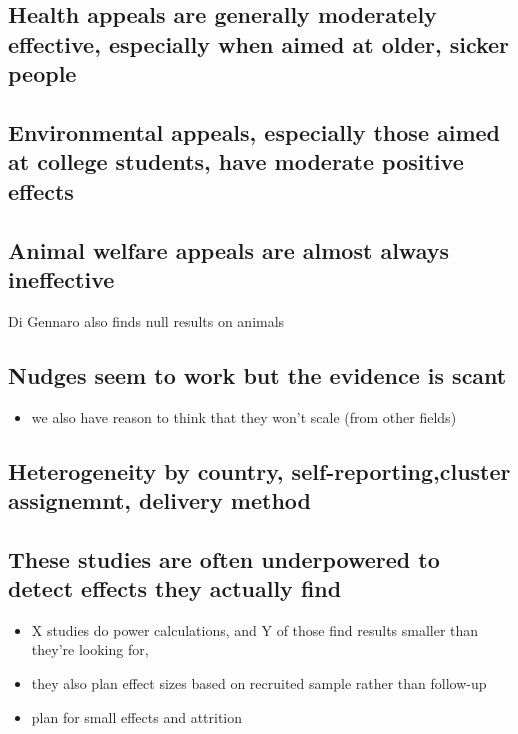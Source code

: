 \documentclass[sn-nature,pdflatex]{sn-jnl}
\providecommand{\tightlist}{%
  \setlength{\itemsep}{0pt}\setlength{\parskip}{0pt}}
\begin{document}
\subsection{Health appeals are generally moderately effective,
especially when aimed at older, sicker
people}\label{health-appeals-are-generally-moderately-effective-especially-when-aimed-at-older-sicker-people}

\subsection{Environmental appeals, especially those aimed at college
students, have moderate positive
effects}\label{environmental-appeals-especially-those-aimed-at-college-students-have-moderate-positive-effects}

\subsection{Animal welfare appeals are almost always
ineffective}\label{animal-welfare-appeals-are-almost-always-ineffective}

Di Gennaro also finds null results on animals

\subsection{Nudges seem to work but the evidence is
scant}\label{nudges-seem-to-work-but-the-evidence-is-scant}

\begin{itemize}
\tightlist
\item
  we also have reason to think that they won't scale (from other fields)
\end{itemize}

\subsection{Heterogeneity by country, self-reporting,cluster assignemnt,
delivery
method}\label{heterogeneity-by-country-self-reportingcluster-assignemnt-delivery-method}

\subsection{These studies are often underpowered to detect effects they
actually
find}\label{these-studies-are-often-underpowered-to-detect-effects-they-actually-find}

\begin{itemize}
\tightlist
\item
  X studies do power calculations, and Y of those find results smaller
  than they're looking for,
\item
  they also plan effect sizes based on recruited sample rather than
  follow-up
\item
  plan for small effects and attrition
\end{itemize}
\end{document}
